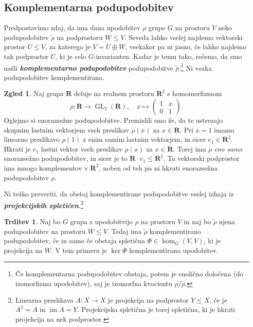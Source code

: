 \documentclass[11pt]{book}
\def\RR{\mathbf{R}}
\DeclareMathOperator\image{im}
\DeclareMathOperator\GL{GL}
\def\definicija{\color{rdeca}\bf\em}
\theoremstyle{definition}
\theoremstyle{zgled}
\newtheorem*{zgled}{Zgled}
\theoremstyle{odprtproblem}
\theoremstyle{domacanaloga}
\theoremstyle{izrek}
\newtheorem*{trditev}{Trditev}
\begin{document}
\subsection{Komplementarna podupodobitev}

Predpostavimo zdaj, da ima dana upodobitev $\rho$ grupe $G$ na prostoru $V$ neko podupodobitev $\tilde\rho$ na podprostoru $W \leq V$. Seveda lahko vselej najdemo vektorski prostor $U \leq V$, za katerega je $V = U \oplus W$, vsekakor pa ni jasno, če lahko najdemo tak podprostor $U$, ki je celo $G$-invarianten. Kadar je temu tako, rečemo, da smo našli {\definicija komplementarno podupodobitev} podupodobitve $\tilde\rho$.\footnote{Če komplementarna podupodobitev obstaja, potem je enolično določena (do izomorfizma upodobitev), saj je izomorfna kvocientu $\rho/\tilde\rho$.} Ni vsaka podupodobitev komplementirana.

\begin{zgled}
Naj grupa $\RR$ deluje na realnem prostoru $\RR^2$ s homomorfizmom
    \[
        \rho \colon \RR \to {\textstyle \GL_2(\RR)}, \quad
        x \mapsto 
        \begin{pmatrix} 
        1 & x \\ 0 & 1 
    \end{pmatrix}.
\]
Oglejmo si enorazsežne podupodobitve. Premislili smo že, da te ustrezajo skupnim lastnim vektorjem vseh preslikav $\rho(x)$ za $x \in \RR$. Pri $x = 1$ imamo linearno preslikavo $\rho(1)$ z enim samim lastnim vektorjem, in sicer $e_1 \in \RR^2$. Hkrati je $e_1$ lastni vektor vseh preslikav $\rho(x)$ za $x \in \RR$. Torej ima $\rho$ \emph{eno samo} enorazsežno podupodobitev, in sicer je to $\RR \cdot e_1 \leq \RR^2$. Ta vektorski podprostor ima mnogo komplementov v $\RR^2$, noben od teh pa ni hkrati enorazsežna podupodobitev $\rho$.
\end{zgled}

Ni težko preveriti, da obstoj komplementirane podupodobitve vselej izhaja iz {\definicija projekcijskih spletičen}.\footnote{Linearna preslikava $A \colon X \to X$ je projekcija na podprostor $Y \leq X$, če je $A^2 = A$ in $\image A = Y$. Projekcijska spletična je torej spletična, ki je hkrati projekcija na nek podprostor.}

\begin{trditev}
Naj bo $G$ grupa z upodobitvijo $\rho$ na prostoru $V$ in naj bo $\tilde \rho$ njena podupodobitev na prostoru $W \leq V$. Tedaj ima $\tilde \rho$ komplementirano podupodobitev, če in samo če obstaja spletična $\Phi \in \hom_G(V,V)$, ki je projekcija na $W$. V tem primeru je $\ker \Phi$ komplementirana upodobitev.
\end{trditev}
\end{document}
